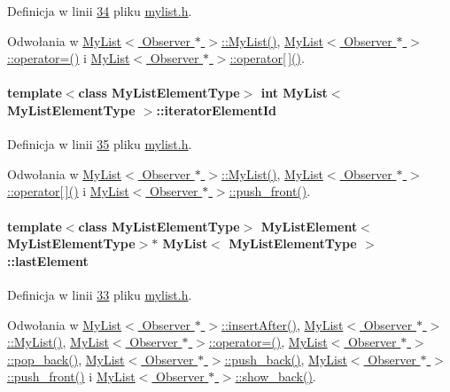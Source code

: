 Definicja w linii \hyperlink{mylist_8h_source_l00034}{34} pliku \hyperlink{mylist_8h_source}{mylist.\-h}.



Odwołania w \hyperlink{mylist_8h_source_l00039}{My\-List$<$ Observer $\ast$ $>$\-::\-My\-List()}, \hyperlink{mylist_8h_source_l00234}{My\-List$<$ Observer $\ast$ $>$\-::operator=()} i \hyperlink{mylist_8h_source_l00171}{My\-List$<$ Observer $\ast$ $>$\-::operator\mbox{[}$\,$\mbox{]}()}.

\hypertarget{class_my_list_ad27795091bcc0c321d81c2196bc1cbb0}{
\paragraph[{iterator\-Element\-Id}]{\setlength{\rightskip}{0pt plus 5cm}template$<$class My\-List\-Element\-Type$>$ int {\bf My\-List}$<$ My\-List\-Element\-Type $>$\-::iterator\-Element\-Id}}\label{class_my_list_ad27795091bcc0c321d81c2196bc1cbb0}


Definicja w linii \hyperlink{mylist_8h_source_l00035}{35} pliku \hyperlink{mylist_8h_source}{mylist.\-h}.



Odwołania w \hyperlink{mylist_8h_source_l00039}{My\-List$<$ Observer $\ast$ $>$\-::\-My\-List()}, \hyperlink{mylist_8h_source_l00171}{My\-List$<$ Observer $\ast$ $>$\-::operator\mbox{[}$\,$\mbox{]}()} i \hyperlink{mylist_8h_source_l00125}{My\-List$<$ Observer $\ast$ $>$\-::push\-\_\-front()}.

\hypertarget{class_my_list_a70831dde3a7f24c7d3dd5b30980e8c27}{
\paragraph[{last\-Element}]{\setlength{\rightskip}{0pt plus 5cm}template$<$class My\-List\-Element\-Type$>$ {\bf My\-List\-Element}$<$My\-List\-Element\-Type$>$$\ast$ {\bf My\-List}$<$ My\-List\-Element\-Type $>$\-::last\-Element}}\label{class_my_list_a70831dde3a7f24c7d3dd5b30980e8c27}


Definicja w linii \hyperlink{mylist_8h_source_l00033}{33} pliku \hyperlink{mylist_8h_source}{mylist.\-h}.



Odwołania w \hyperlink{mylist_8h_source_l00212}{My\-List$<$ Observer $\ast$ $>$\-::insert\-After()}, \hyperlink{mylist_8h_source_l00039}{My\-List$<$ Observer $\ast$ $>$\-::\-My\-List()}, \hyperlink{mylist_8h_source_l00234}{My\-List$<$ Observer $\ast$ $>$\-::operator=()}, \hyperlink{mylist_8h_source_l00084}{My\-List$<$ Observer $\ast$ $>$\-::pop\-\_\-back()}, \hyperlink{mylist_8h_source_l00112}{My\-List$<$ Observer $\ast$ $>$\-::push\-\_\-back()}, \hyperlink{mylist_8h_source_l00125}{My\-List$<$ Observer $\ast$ $>$\-::push\-\_\-front()} i \hyperlink{mylist_8h_source_l00147}{My\-List$<$ Observer $\ast$ $>$\-::show\-\_\-back()}.

